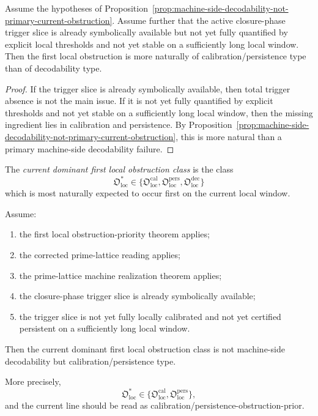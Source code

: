 \begin{proposition}
\label{prop:current-obstruction-split-is-calibration-persistence-dominant}
Assume the hypotheses of Proposition~\ref{prop:machine-side-decodability-not-primary-current-obstruction}.
Assume further that the active closure-phase trigger slice is already symbolically available but not yet fully quantified by explicit local thresholds and not yet stable on a sufficiently long local window.
Then the first local obstruction is more naturally of calibration/persistence type than of decodability type.
\end{proposition}

\begin{proof}
If the trigger slice is already symbolically available, then total trigger absence is not the main issue.
If it is not yet fully quantified by explicit thresholds and not yet stable on a sufficiently long local window, then the missing ingredient lies in calibration and persistence.
By Proposition~\ref{prop:machine-side-decodability-not-primary-current-obstruction}, this is more natural than a primary machine-side decodability failure.
\end{proof}

\begin{definition}
\label{def:current-dominant-first-local-obstruction-class}
The \emph{current dominant first local obstruction class} is the class
\[
\mathfrak{O}_{\mathrm{loc}}^{\ast}
\in
\{
\mathfrak{O}_{\mathrm{loc}}^{\mathrm{cal}},
\mathfrak{O}_{\mathrm{loc}}^{\mathrm{pers}},
\mathfrak{O}_{\mathrm{loc}}^{\mathrm{dec}}
\}
\]
which is most naturally expected to occur first on the current local window.
\end{definition}

\begin{theorem}
\label{thm:first-local-obstruction-classification-theorem}
Assume:
\begin{enumerate}
    \item the first local obstruction-priority theorem applies;
    \item the corrected prime-lattice reading applies;
    \item the prime-lattice machine realization theorem applies;
    \item the closure-phase trigger slice is already symbolically available;
    \item the trigger slice is not yet fully locally calibrated and not yet certified persistent on a sufficiently long local window.
\end{enumerate}
Then the current dominant first local obstruction class is not machine-side decodability but calibration/persistence type.

More precisely,
\[
\mathfrak{O}_{\mathrm{loc}}^{\ast}
\in
\{
\mathfrak{O}_{\mathrm{loc}}^{\mathrm{cal}},
\mathfrak{O}_{\mathrm{loc}}^{\mathrm{pers}}
\},
\]
and the current line should be read as calibration/persistence-obstruction-prior.
\end{theorem}

